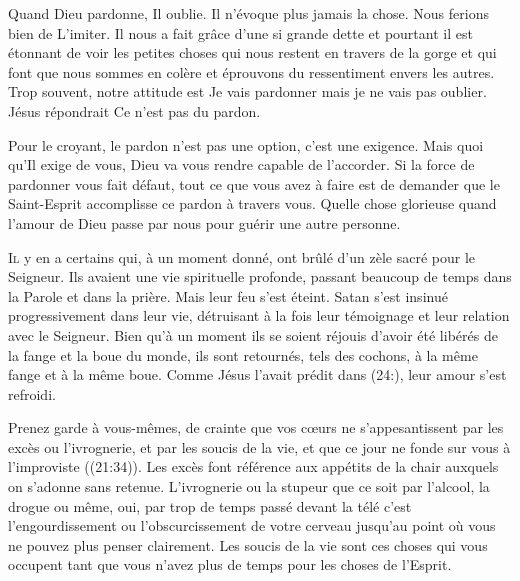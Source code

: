 
Quand Dieu pardonne, Il oublie. Il n'évoque plus jamais la chose.
 Nous ferions bien de L'imiter. Il nous a fait grâce d'une si grande dette
 et pourtant il est étonnant de voir les petites choses
 qui nous restent en travers de la gorge et qui font que nous sommes en colère
 et éprouvons du ressentiment envers les autres.
 Trop souvent, notre attitude est\frcolon{} 
 \Og Je vais pardonner \ocadr mais je ne vais pas oublier. \Fg{}
 Jésus répondrait\frcolon{} \Og Ce n'est pas du pardon. \Fg{}

Pour le croyant, le pardon n'est pas une option, c'est une exigence.
 Mais quoi qu'Il  exige de vous, Dieu va vous rendre
 capable de l'accorder. Si la force de pardonner vous fait défaut,
 tout ce que vous avez à faire est de demander que le Saint-Esprit
 accomplisse ce pardon à travers vous.
 Quelle chose glorieuse quand l'amour de Dieu passe par nous pour guérir
 une autre personne. 

\dvrule







\lettrine{I}{l} y en a certains qui, à un moment donné,
 ont brûlé d'un zèle sacré pour le Seigneur.
 Ils avaient une vie spirituelle profonde, passant beaucoup de temps
 dans la Parole et dans la prière. Mais leur feu s'est éteint.
 Satan s'est insinué progressivement dans leur vie, détruisant à la fois
 leur témoignage et leur relation avec le Seigneur.
 Bien qu'à un moment ils se soient réjouis d'avoir été libérés
 de la fange et la boue du monde, ils sont retournés, tels des cochons,
 à la même fange et à la même boue.
 Comme Jésus l'avait prédit dans (24:),
 leur amour s'est refroidi. 


\Og Prenez garde à vous-mêmes, de crainte que vos c\oe{}urs
 ne s'appesantissent par les excès ou l'ivrognerie,
 et par les soucis de la vie, et que ce jour ne fonde sur vous
 à l'improviste \Fg{} ((21:34)).
 Les excès font référence aux appétits de la chair auxquels
 on s'adonne sans retenue. L'ivrognerie ou la stupeur
 \ocadr que ce soit par l'alcool, la drogue ou même, oui,
 par trop de temps passé devant la télé \fcadr{} c'est l'engourdissement
 ou l'obscurcissement de votre cerveau jusqu'au point
 où vous ne pouvez plus penser clairement.
 Les soucis de la vie sont ces choses qui vous occupent
 tant que vous n'avez plus de temps pour les choses de l'Esprit. 

